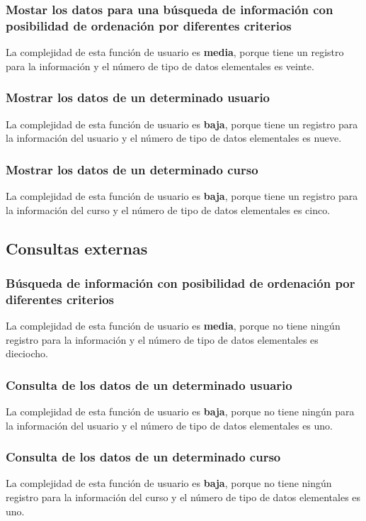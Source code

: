 \documentclass[11pt,a4paper,spanish,twoside]{book}
\begin{document}
\subsubsection{Mostar los datos para una búsqueda de información con
posibilidad de ordenación por diferentes criterios}
La complejidad de esta función de usuario es \textbf{media}, porque tiene un
registro para la información y el número de tipo de datos elementales es veinte.

\subsubsection{Mostrar los datos de un determinado usuario}
La complejidad de esta función de usuario es \textbf{baja}, porque tiene un
registro para la información del usuario y el número de tipo de datos
elementales es nueve.

\subsubsection{Mostrar los datos de un determinado curso}
La complejidad de esta función de usuario es \textbf{baja}, porque tiene un
registro para la información del curso y el número de tipo de datos
elementales es cinco.

\subsection{Consultas externas}
\subsubsection{Búsqueda de información con posibilidad de ordenación por
  diferentes criterios}
La complejidad de esta función de usuario es \textbf{media}, porque no tiene
ningún registro para la información y el número de tipo de datos elementales
es dieciocho.

\subsubsection{Consulta de los datos de un determinado usuario}
La complejidad de esta función de usuario es \textbf{baja}, porque no tiene
ningún para la información del usuario y el número de tipo de datos
elementales es uno.

\subsubsection{Consulta de los datos de un determinado curso}
La complejidad de esta función de usuario es \textbf{baja}, porque no tiene
ningún registro para la información del curso y el número de tipo de datos
elementales es uno.
\end{document}
